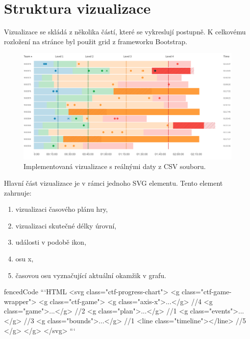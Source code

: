 \documentclass[
  digital, %
  oneside, %
  table,   %
  nolof,     %
  nolot,     %
]{fithesis3}
\begin{document}
\section{Struktura vizualizace}
Vizualizace se skládá z několika částí, které se vykreslují postupně. K celkovému rozložení na stránce byl použit grid z frameworku Bootstrap.

\begin{figure}[H]
  \begin{center}
    \includegraphics[width=12.7cm]{images/ctf-all.pdf}
  \end{center}
  \caption{Implementovaná vizualizace s reálnými daty z CSV souboru.}
  \label{fig:visualizationChart}
\end{figure}

Hlavní část vizualizace je v rámci jednoho SVG elementu. Tento element zahrnuje:
\begin{enumerate}
  \item vizualizaci časového plánu hry,
  \item vizualizaci skutečné délky úrovní,
  \item události v podobě ikon,
  \item osu x,
  \item časovou osu vyznačující aktuální okamžik v grafu.
\end{enumerate}

\begin{markdown*}{
  fencedCode
}
```HTML
<svg class="ctf-progress-chart">
   <g class="ctf-game-wrapper">
      <g class="ctf-game">
         <g class="axis-x">...</g>		  //4
         <g class="game">...</g>		  //2
         <g class="plan">...</g>		  //1
         <g class="events">...</g>		  //3
         <g class="bounds">...</g>		  //1
         <line class="timeline"></line>	  //5
      </g>
   </g>
</svg>
```
\end{markdown*}
\end{document}
